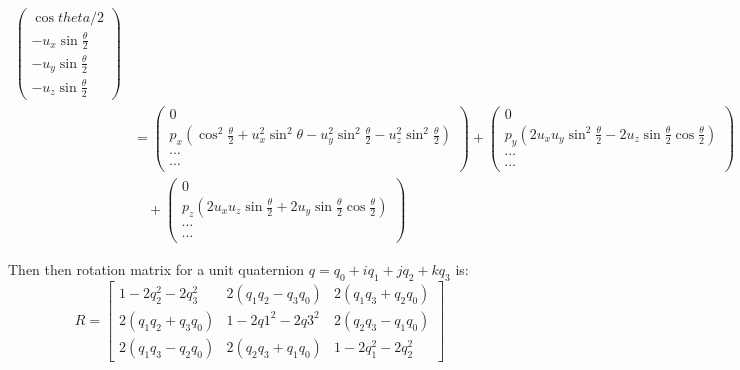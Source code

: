\documentclass{article}
\begin{document}
\begin{displaymath}
\begin{aligned}
\begin{pmatrix}
      \cos{theta/2}  \\
      -u_x\sin{\frac{\theta}{2}}  \\
      -u_y\sin{\frac{\theta}{2}}  \\
      -u_z\sin{\frac{\theta}{2}}
    \end{pmatrix} \\
    &= \begin{pmatrix} 0 \\
      p_x(\cos^2{\frac{\theta}{2}}+u_x^2\sin^2{\theta}-u_y^2\sin^2{\frac{\theta}{2}}-u_z^2\sin^2{\frac{\theta}{2}}) \\
      \cdots \\ \cdots \end{pmatrix} 
    + \begin{pmatrix}
      0 \\
      p_y(2u_xu_y\sin^2{\frac{\theta}{2}}-2u_z\sin{\frac{\theta}{2}}\cos{\frac{\theta}{2}}) \\
      \cdots \\ \cdots \end{pmatrix} \\
    & \quad + \begin{pmatrix} 0 \\
      p_z(2u_xu_z\sin{\frac{\theta}{2}}+2u_y\sin{\frac{\theta}{2}}\cos{\frac{\theta}{2}})  \\
      \cdots \\ \cdots \end{pmatrix}
  \end{aligned}
\end{displaymath}

Then then rotation matrix for a unit quaternion $q = q_0 + iq_1 + jq_2 + kq_3$ is:
\begin{equation}
  R = \begin{bmatrix}
    1-2q_2^2-2q_3^2 & 2(q_1q_2-q_3q_0)  & 2(q_1q_3+q_2q_0)  \\
    2(q_1q_2+q_3q_0)  & 1-2q1^2-2q3^2 & 2(q_2q_3-q_1q_0)  \\
    2(q_1q_3-q_2q_0)  & 2(q_2q_3+q_1q_0)  & 1-2q_1^2-2q_2^2
  \end{bmatrix}
\end{equation}
\end{document}
